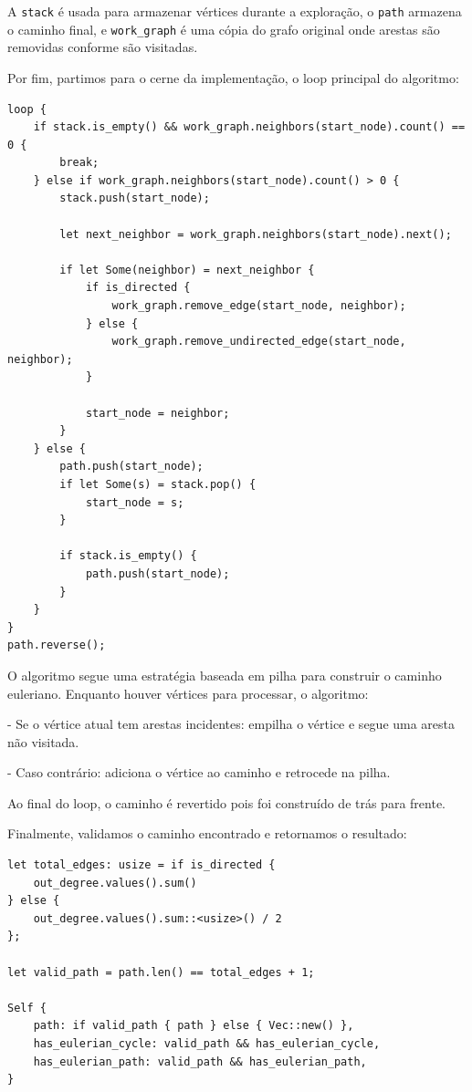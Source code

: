 A \texttt{stack} é usada para armazenar vértices durante a exploração, o 
\texttt{path} armazena o caminho final, e \texttt{work\_graph} é uma cópia
do grafo original onde arestas são removidas conforme são visitadas.

Por fim, partimos para o cerne da implementação, o loop principal do algoritmo:

\begin{verbatim}
loop {
    if stack.is_empty() && work_graph.neighbors(start_node).count() == 0 {
        break;
    } else if work_graph.neighbors(start_node).count() > 0 {
        stack.push(start_node);

        let next_neighbor = work_graph.neighbors(start_node).next();

        if let Some(neighbor) = next_neighbor {
            if is_directed {
                work_graph.remove_edge(start_node, neighbor);
            } else {
                work_graph.remove_undirected_edge(start_node, neighbor);
            }

            start_node = neighbor;
        }
    } else {
        path.push(start_node);
        if let Some(s) = stack.pop() {
            start_node = s;
        }

        if stack.is_empty() {
            path.push(start_node);
        }
    }
}
path.reverse();
\end{verbatim}

O algoritmo segue uma estratégia baseada em pilha para construir o caminho
euleriano. Enquanto houver vértices para processar, o algoritmo:

- Se o vértice atual tem arestas incidentes: empilha o vértice e segue uma aresta não visitada.

- Caso contrário: adiciona o vértice ao caminho e retrocede na pilha.

Ao final do loop, o caminho é revertido pois foi construído de trás para frente.

Finalmente, validamos o caminho encontrado e retornamos o resultado:

\begin{verbatim}
let total_edges: usize = if is_directed {
    out_degree.values().sum()
} else {
    out_degree.values().sum::<usize>() / 2
};

let valid_path = path.len() == total_edges + 1;

Self {
    path: if valid_path { path } else { Vec::new() },
    has_eulerian_cycle: valid_path && has_eulerian_cycle,
    has_eulerian_path: valid_path && has_eulerian_path,
}
\end{verbatim}

